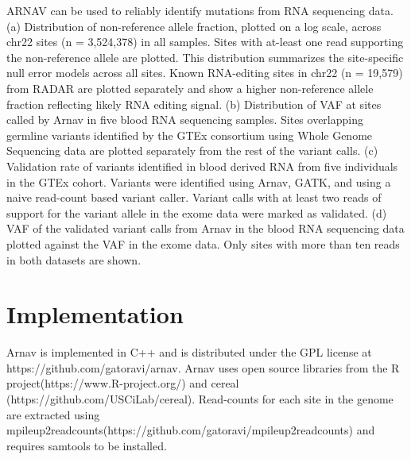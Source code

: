 ARNAV can be used to reliably identify mutations from RNA sequencing data. (a) Distribution of non-reference allele fraction, plotted on a log scale, across chr22 sites (n = 3,524,378) in all samples. Sites with at-least one read supporting the non-reference allele are plotted. This distribution summarizes the site-specific null error models across all sites. Known RNA-editing sites in chr22 (n = 19,579) from RADAR \cite{ramaswami2014nar} are plotted separately and show a higher non-reference allele fraction reflecting likely RNA editing signal. (b) Distribution of VAF at sites called by Arnav in five blood RNA sequencing samples. Sites overlapping germline variants identified by the GTEx consortium using Whole Genome Sequencing data are plotted separately from the rest of the variant calls. (c) Validation rate of variants identified in blood derived RNA from five individuals in the GTEx cohort. Variants were identified using Arnav, GATK, and using a naive read-count based variant caller. Variant calls with at least two reads of support for the variant allele in the exome data were marked as validated. (d) VAF of the validated variant calls from Arnav in the blood RNA sequencing data plotted against the VAF in the exome data. Only sites with more than ten reads in both datasets are shown.

\section{Implementation}
Arnav is implemented in C++ and is distributed under the GPL license at https://github.com/gatoravi/arnav. Arnav uses open source libraries from the R project(https://www.R-project.org/) and cereal (https://github.com/USCiLab/cereal). Read-counts for each site in the genome are extracted using mpileup2readcounts(https://github.com/gatoravi/mpileup2readcounts) and requires samtools \cite{li2009b} to be installed.
